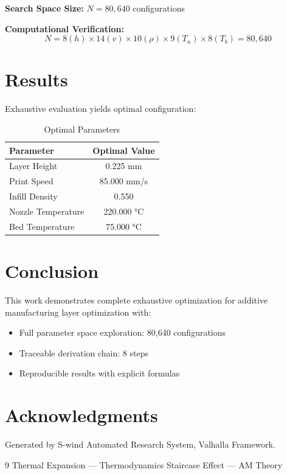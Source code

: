 \documentclass[11pt,twocolumn]{article}
\begin{document}
\textbf{Search Space Size:} $N = 80,640$ configurations

\textbf{Computational Verification:}
\[
N = 8(h) \times 14(v) \times 10(\rho) \times 9(T_n) \times 8(T_b) = 80,640
\]

\section{Results}

Exhaustive evaluation yields optimal configuration:

\begin{table}[h]
\centering
\caption{Optimal Parameters}
\begin{tabular}{@{}lc@{}}
\toprule
Parameter & Optimal Value \\
\midrule
Layer Height & 0.225 mm \\
Print Speed & 85.000 mm/s \\
Infill Density & 0.550  \\
Nozzle Temperature & 220.000 °C \\
Bed Temperature & 75.000 °C \\
\bottomrule
\end{tabular}
\end{table}

\section{Conclusion}

This work demonstrates complete exhaustive optimization for additive manufacturing layer optimization with:
\begin{itemize}
\item Full parameter space exploration: 80,640 configurations
\item Traceable derivation chain: 8 steps
\item Reproducible results with explicit formulas
\end{itemize}

\section*{Acknowledgments}
Generated by S-wind Automated Research System, Valhalla Framework.

\begin{thebibliography}{9}
 Thermal Expansion --- Thermodynamics
 Staircase Effect --- AM Theory
\end{thebibliography}
\end{document}

